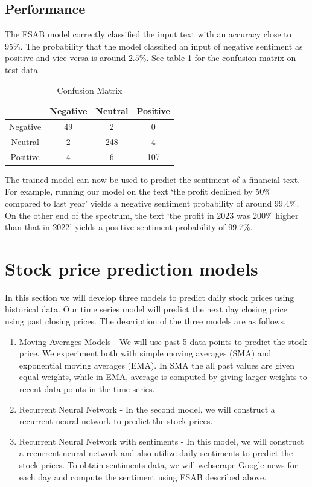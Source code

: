 \documentclass[11pt]{article}
\begin{document}
\subsection{Performance}
The FSAB model correctly classified the input text with an accuracy close to $95\%$. The probability that the model classified an input of negative sentiment as positive and vice-versa is around $2.5\%$. See table \ref{tab_confusion_matrix} for the confusion matrix on test data.
\begin{table}[h!]
	\centering
	\begin{tabular}{|c|c|c|c|}
		\hline
		& Negative & Neutral & Positive \\
		\hline
		Negative & 49 & 2 & 0\\
		\hline
		Neutral & 2 & 248 & 4\\
		\hline
		Positive & 4 & 6 & 107\\
		\hline
	\end{tabular}
	\caption{Confusion Matrix}
	\label{tab_confusion_matrix}
\end{table}
The trained model can now be used to predict the sentiment of a financial text. For example, running our model on the text `the profit declined by 50\% compared to last year' yields a negative sentiment probability of around 99.4\%. On the other end of the spectrum, the text `the profit in 2023 was 200\% higher than that in 2022' yields a positive sentiment probability of 99.7\%.




\section{Stock price prediction models}\label{sec_stock}
In this section we will develop three models to predict daily stock prices using historical data. Our time series model will predict the next day closing price using past closing prices. The description of the three models are as follows.
\begin{enumerate}
	\item Moving Averages Models - We will use past 5 data points to predict the stock price. We experiment both with simple moving averages (SMA) and exponential moving averages (EMA). In SMA the all past values are given equal weights, while in EMA, average is computed by giving larger weights to recent data points in the time series.
	\item Recurrent Neural Network - In the second model, we will construct a recurrent neural network to predict the stock prices.
	\item Recurrent Neural Network with sentiments - In this model, we will construct a recurrent neural network and also utilize daily sentiments to predict the stock prices. To obtain sentiments data, we will webscrape Google news for each day and compute the sentiment using FSAB described above. 
\end{enumerate}
\end{document}
